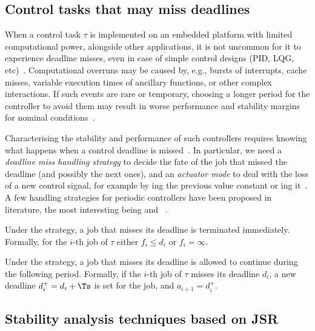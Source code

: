 \subsection{Control tasks that may miss deadlines}
\label{sec:back_deadline_miss}
When a control task $\tau$ is implemented on an embedded platform with limited computational power, alongside other applications, it is not uncommon for it to experience deadline misses, even in case of simple control designs (PID, LQG, etc)~\cite{akesson2020empirical,pazzaglia2021adaptive}.
Computational overruns may be caused by, e.g., bursts of interrupts, cache misses, variable execution times of ancillary functions, or other complex interactions.
If such events are rare or temporary, choosing a longer period for the controller to avoid them may result in worse performance and stability margins for nominal conditions~\cite{Pazzaglia:2019}.

Characterising the stability and performance of such controllers requires knowing what happens when a control deadline is missed~\cite{Pazzaglia:2019,Maggio:2020,Vreman:2021}.
In particular, we need a \emph{deadline miss handling strategy} to decide the fate of the job that missed the deadline (and possibly the next ones), and an \emph{actuator mode} to deal with the loss of a new control signal, for example by \tH{}ing the previous value constant or \tZ{}ing it~\cite{schenato09}.
A few handling strategies for periodic controllers have been proposed in literature, the most interesting being \tK{} and \tS{}~\cite{Cervin:2005,Pazzaglia:2019,Maggio:2020}.

\begin{definition}[\tK{} strategy]%
    \label{def:kill}%
    Under the \tK{} strategy, a job that misses its deadline is terminated immediately. 
    Formally, for the $i$-th job of $\tau$ either $f_i\leq d_i$ or $f_i=\infty$.
\end{definition}

\begin{definition}[\tS{} strategy]%
    \label{def:skip}%
    Under the \tS{} strategy, a job that misses its deadline is allowed to continue during the following period.
    Formally, if the $i$-th job of $\tau$ misses its deadline $d_i$, a new deadline $d^{+}_i = d_i + \Ts$ is set for the job, and $a_{i+1} = d^{+}_i$.
\end{definition}


\subsection{Stability analysis techniques based on JSR}
\label{sec:existing}

